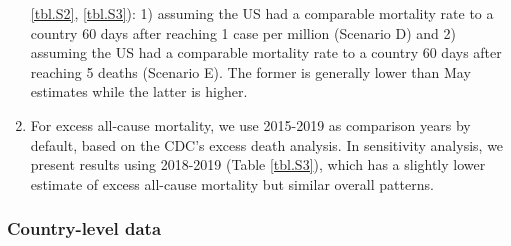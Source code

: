 \documentclass[
]{article}
\begin{document}
\begin{enumerate}
  \ref{tbl.S2}, \ref{tbl.S3}): 1) assuming the US had a comparable
  mortality rate to a country 60 days after reaching 1 case per million
  (Scenario D) and 2) assuming the US had a comparable mortality rate to
  a country 60 days after reaching 5 deaths (Scenario E). The former is
  generally lower than May estimates while the latter is higher.
\item
  For excess all-cause mortality, we use 2015-2019 as comparison years
  by default, based on the CDC's excess death analysis. In sensitivity
  analysis, we present results using 2018-2019 (Table \ref{tbl.S3}),
  which has a slightly lower estimate of excess all-cause mortality but
  similar overall patterns.
\end{enumerate}

\bigskip

\hypertarget{country-level-data}{%
\subsubsection{Country-level data}\label{country-level-data}}
\end{document}

